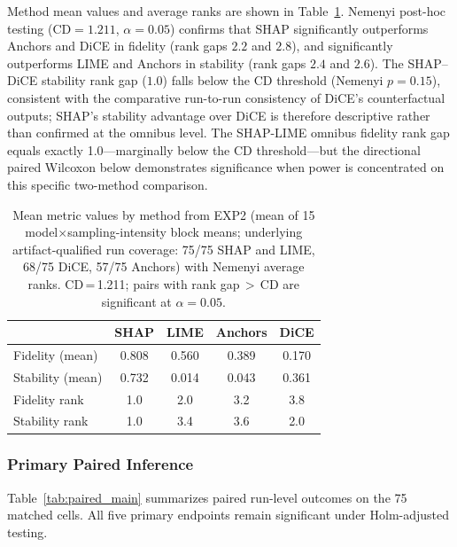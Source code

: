 \documentclass[twoside,11pt]{article}
\begin{document}
Method mean values and average ranks are shown in
Table~\ref{tab:method_ranks}. Nemenyi post-hoc testing
($\mathrm{CD}=1.211$, $\alpha=0.05$) confirms that SHAP significantly
outperforms Anchors and DiCE in fidelity (rank gaps $2.2$ and $2.8$), and
significantly outperforms LIME and Anchors in stability (rank gaps
$2.4$ and $2.6$). The SHAP--DiCE stability rank gap ($1.0$) falls below
the CD threshold (Nemenyi $p = 0.15$), consistent with the comparative
run-to-run consistency of DiCE's counterfactual outputs; SHAP's stability
advantage over DiCE is therefore descriptive rather than confirmed at the
omnibus level. The SHAP-LIME omnibus fidelity rank gap equals
exactly 1.0---marginally below the CD threshold---but the directional
paired Wilcoxon below demonstrates significance when power is concentrated
on this specific two-method comparison.

\begin{table}[t]
\centering
\caption{Mean metric values by method from EXP2 (mean of 15
model$\times$sampling-intensity block means; underlying artifact-qualified
run coverage: 75/75 SHAP and LIME, 68/75 DiCE, 57/75 Anchors) with Nemenyi
average ranks. CD\,=\,1.211; pairs with rank gap\,$>$\,CD are significant at
$\alpha=0.05$.}
\label{tab:method_ranks}
\begin{tabular}{lcccc}
\toprule
          & SHAP  & LIME  & Anchors & DiCE  \\
\midrule
Fidelity (mean)   & 0.808 & 0.560 & 0.389   & 0.170 \\
Stability (mean)  & 0.732 & 0.014 & 0.043   & 0.361 \\
\midrule
Fidelity rank     & 1.0   & 2.0   & 3.2     & 3.8   \\
Stability rank    & 1.0   & 3.4   & 3.6     & 2.0   \\
\bottomrule
\end{tabular}
\end{table}

\subsubsection*{Primary Paired Inference}

Table~\ref{tab:paired_main} summarizes paired run-level outcomes on the
75 matched cells. All five primary endpoints remain significant under
Holm-adjusted testing.
\end{document}
